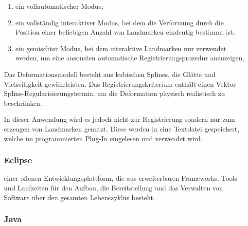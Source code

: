 \begin{enumerate}
\item ein vollautomatischer Modus; 
\item ein vollständig interaktiver Modus, bei dem die Verformung durch die Position einer beliebigen Anzahl von Landmarken eindeutig bestimmt ist; 
\item ein gemischter Modus, bei dem interaktive Landmarken nur verwendet werden, um eine ansonsten automatische Registrierungsprozedur anzuzeigen.
\end{enumerate}

Das Deformationsmodell besteht aus kubischen Splines, die Glätte und Vielseitigkeit gewährleisten. Das Registrierungskriterium enthält einen Vektor-Spline-Regularisierungstermin, um die Deformation physisch realistisch zu beschränken.\cite{unwrapj}

In dieser Anwendung wird es jedoch nicht zur Registrierung sondern nur zum erzeugen von Landmarken genutzt. Diese werden in eine Textdatei gespeichert, welche im programmierten Plug-In eingelesen und verwendet wird.



\newpage

\subsubsection{Eclipse}
einer offenen Entwicklungsplattform, die aus erweiterbaren Frameworks, Tools und Laufzeiten für den Aufbau, die Bereitstellung und das Verwalten von Software über den gesamten Lebenszyklus besteht.
\cite{eclipse}

\subsubsection{Java}